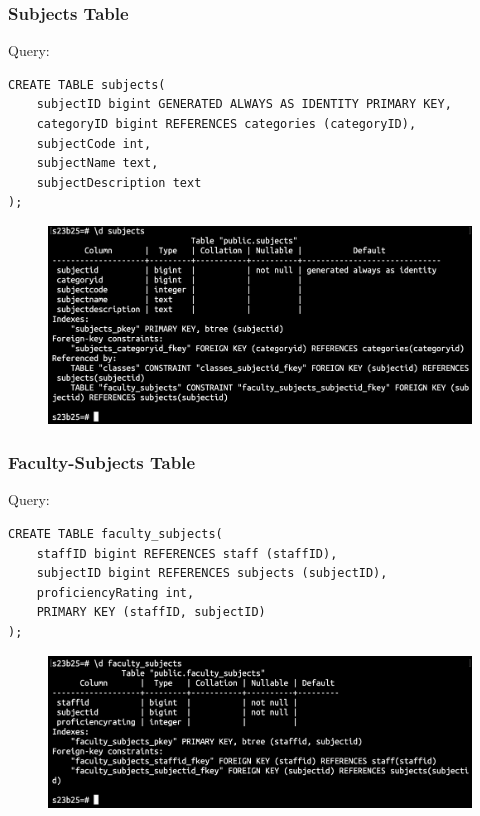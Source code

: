 \documentclass{article}
\begin{document}
\subsubsection*{Subjects Table}
Query:
\begin{Verbatim}[frame=single,framerule=1pt,fontfamily=courier,fontsize=\small]
CREATE TABLE subjects(
    subjectID bigint GENERATED ALWAYS AS IDENTITY PRIMARY KEY,
    categoryID bigint REFERENCES categories (categoryID),
    subjectCode int,
    subjectName text,
    subjectDescription text
);
\end{Verbatim}
\begin{figure}[h]
    \centering
    \includegraphics[width=\textwidth]{./o_5_subjects.png}
\end{figure}

\subsubsection*{Faculty-Subjects Table}
Query:
\begin{Verbatim}[frame=single,framerule=1pt,fontfamily=courier,fontsize=\small]
CREATE TABLE faculty_subjects(
    staffID bigint REFERENCES staff (staffID),
    subjectID bigint REFERENCES subjects (subjectID),
    proficiencyRating int,
    PRIMARY KEY (staffID, subjectID)
);
\end{Verbatim}
\begin{figure}[h]
    \centering
    \includegraphics[width=\textwidth]{./o_6_faculty_subjects.png}
\end{figure}
\end{document}
